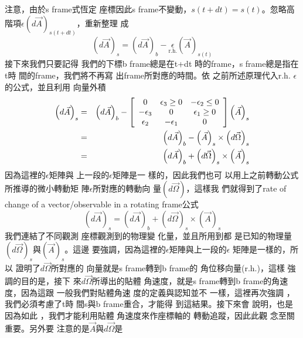 \documentclass{article}
\begin{document}
注意，由於s frame式恆定%
座標因此s frame不變動，$%
s(t+dt)=s(t)$。忽略高階項$\epsilon
\left( d\vec{A}\right) _{s(t+dt)}$，重新整理%
成%
\begin{equation*}
\left( d\vec{A}\right) _{s}=\left( d\vec{A}\right) _{b}-\underset{\text{r.h.}%
}{\epsilon }\left( \vec{A}\right) _{s(t)}
\end{equation*}%
接下來我們只要記得%
我們的下標b frame總是在t+dt%
時的frame，s frame總是指在t時%
間的frame，我們將不再寫%
出frame所對應的時間。依%
之前所述原理代入r.h. $%
\epsilon $的公式，並且利用%
向量外積%
\begin{eqnarray}
\left( d\vec{A}\right) _{s} &=&\left( d\vec{A}\right) _{b}-\left[ 
\begin{array}{ccc}
0 & \epsilon _{3}\geq 0 & -\epsilon _{2}\leq 0 \\ 
-\epsilon _{3} & 0 & \epsilon _{1}\geq 0 \\ 
\epsilon _{2} & -\epsilon _{1} & 0%
\end{array}%
\right] \left( \vec{A}\right) _{s}  \notag \\
&=&\left( d\vec{A}\right) _{b}-\left( \vec{A}\right) _{s}\times \left( d\vec{%
\Omega}\right) _{s}  \label{roc3} \\
&=&\left( d\vec{A}\right) _{b}+\left( d\vec{\Omega}\right) _{s}\times \left( 
\vec{A}\right) _{s}  \notag
\end{eqnarray}%
因為這裡的$\epsilon $矩陣與%
上一段的$\epsilon $矩陣是一%
樣的，因此我們也可%
以用上之前轉動公式%
所推導的微小轉動矩%
陣$\epsilon $所對應的轉動向%
量$\left( d\vec{\Omega}\right) $，這樣我%
們就得到了rate of change of a
vector/observable in a rotating frame公式%
\begin{equation}
\left( d\vec{A}\right) _{s}=\left( d\vec{A}\right) _{b}+\left( d\vec{\Omega}%
\right) _{s}\times \left( \vec{A}\right) _{s}  \label{rateofdomega}
\end{equation}%
我們連結了不同觀測%
座標觀測到的物理變%
化量，並且所用到都%
是已知的物理量$\left( d\vec{\Omega}%
\right) _{s}$與$\left( \vec{A}\right) _{s}$。這邊%
要強調，因為這裡的$%
\epsilon $矩陣與上一段的$\epsilon $%
矩陣是一樣的，所以%
證明了$d\vec{\Omega}$所對應的%
向量就是s frame轉到b frame的%
角位移向量(r.h.)，這樣%
強調的目的是，接下%
來$d\vec{\Omega}$所導出的貼體%
角速度，就是s frame轉到b
frame的角速度，因為這跟%
一般我們對貼體角速%
度的定義與認知並不%
一樣，這裡再次強調%
，我們必須考慮了t時%
間s與b frame重合，才能得%
到這結果。接下來會%
說明，也是因為如此%
，我們才能利用貼體%
角速度來作座標軸的%
轉動追蹤，因此此觀%
念至關重要。另外要%
注意的是$\vec{A}$與$d\vec{\Omega}$是%
\end{document}
